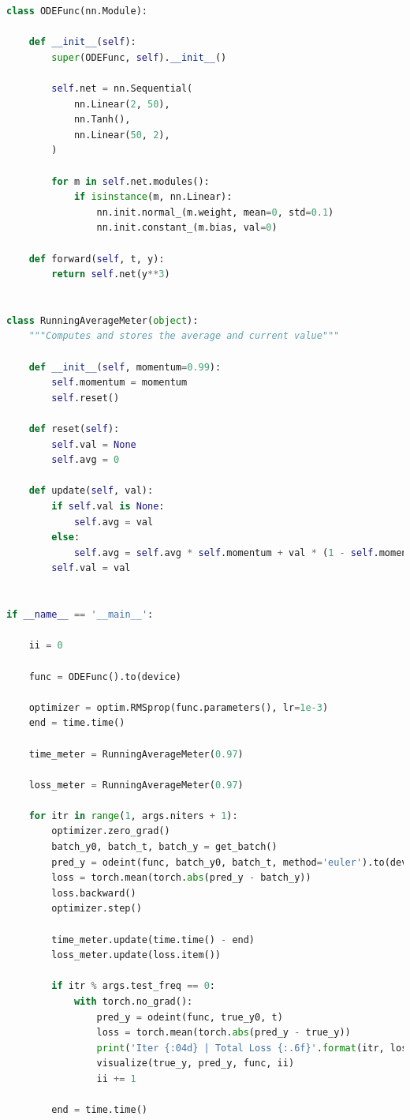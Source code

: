 \documentclass[11pt]{article}
\begin{document}
\begin{lstlisting}[language=Python,caption=Code for training the network on the oscillator.]
  class ODEFunc(nn.Module):

    def __init__(self):
        super(ODEFunc, self).__init__()

        self.net = nn.Sequential(
            nn.Linear(2, 50),
            nn.Tanh(),
            nn.Linear(50, 2),
        )

        for m in self.net.modules():
            if isinstance(m, nn.Linear):
                nn.init.normal_(m.weight, mean=0, std=0.1)
                nn.init.constant_(m.bias, val=0)

    def forward(self, t, y):
        return self.net(y**3)


class RunningAverageMeter(object):
    """Computes and stores the average and current value"""

    def __init__(self, momentum=0.99):
        self.momentum = momentum
        self.reset()

    def reset(self):
        self.val = None
        self.avg = 0

    def update(self, val):
        if self.val is None:
            self.avg = val
        else:
            self.avg = self.avg * self.momentum + val * (1 - self.momentum)
        self.val = val


if __name__ == '__main__':

    ii = 0

    func = ODEFunc().to(device)
    
    optimizer = optim.RMSprop(func.parameters(), lr=1e-3)
    end = time.time()

    time_meter = RunningAverageMeter(0.97)
    
    loss_meter = RunningAverageMeter(0.97)

    for itr in range(1, args.niters + 1):
        optimizer.zero_grad()
        batch_y0, batch_t, batch_y = get_batch()
        pred_y = odeint(func, batch_y0, batch_t, method='euler').to(device)
        loss = torch.mean(torch.abs(pred_y - batch_y))
        loss.backward()
        optimizer.step()

        time_meter.update(time.time() - end)
        loss_meter.update(loss.item())

        if itr % args.test_freq == 0:
            with torch.no_grad():
                pred_y = odeint(func, true_y0, t)
                loss = torch.mean(torch.abs(pred_y - true_y))
                print('Iter {:04d} | Total Loss {:.6f}'.format(itr, loss.item()))
                visualize(true_y, pred_y, func, ii)
                ii += 1

        end = time.time()
\end{lstlisting}
\end{document}
